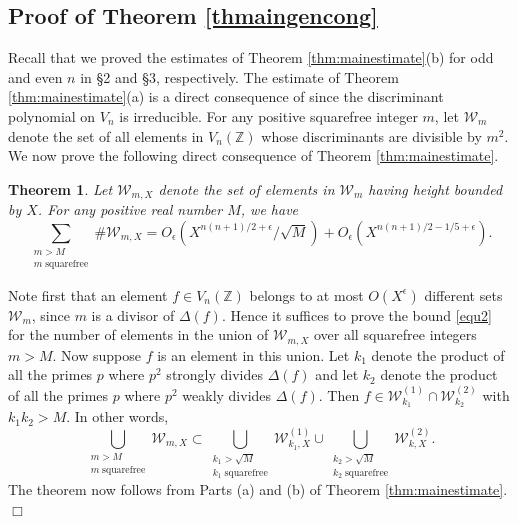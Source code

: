 \documentclass[11pt]{article}
\def\Z{{\mathbb Z}}
\def\U{{\mathcal W}}
\def\Vmn{{V_n}}
\def\Z{{\mathbb Z}}
\newtheorem{theorem}{Theorem}[section]
\newenvironment{proof}{\noindent {\bf Proof:}}{$\Box$ \vspace{2 ex}}
\begin{document}
\subsection{Proof of Theorem \ref{thmaingencong}}

Recall that we proved the estimates of Theorem
\ref{thm:mainestimate}(b) for odd and even $n$ in \S2 and \S3,
respectively. The estimate of Theorem \ref{thm:mainestimate}(a) is a
direct consequence of \cite[Theorem 3.5, Lemma 3.6]{geosieve} since
the discriminant polynomial on $\Vmn$ is irreducible.  For any
positive squarefree integer $m$, let $\U_m$ denote the set of all
elements in $\Vmn(\Z)$ whose discriminants are divisible by $m^2$. We
now prove the following direct consequence of Theorem \ref{thm:mainestimate}.

\begin{theorem}\label{unif}
Let $\U_{m,X}$ denote the set of elements in $\U_m$ having height
bounded by $X$. For any positive real number $M$, we have
\begin{equation}\label{equ2}
\sum_{\substack{m>M\\ m\;\mathrm{ squarefree}}}
\#\U_{m,X}=O_\epsilon(X^{n(n+1)/2+\epsilon}/\sqrt{M})+O_\epsilon(X^{n(n+1)/2-1/5+\epsilon}).
\end{equation}
\end{theorem}
\begin{proof}
Note first that an element $f\in \Vmn(\Z)$ belongs to at most
$O(X^\epsilon)$ different sets $\U_m$, since $m$ is a divisor of
$\Delta(f)$. Hence it suffices to prove the bound \eqref{equ2} for the
number of elements in the union of $\U_{m,X}$ over all squarefree
integers $m>M$. Now suppose $f$ is an element in this union. Let $k_1$
denote the product of all the primes $p$ where $p^2$ strongly divides
$\Delta(f)$ and let $k_2$ denote the product of all the primes $p$
where $p^2$ weakly divides $\Delta(f)$. Then $f\in
\U_{k_1}^{(1)}\cap\U_{k_2}^{(2)}$ with $k_1k_2>M$. In other words,
$$\bigcup_{\substack{m>M\\ m\;\mathrm{ squarefree}}} \U_{m,X} \subset \bigcup_{\substack{k_1>\sqrt{M}\\ k_1\;\mathrm{ squarefree}}} \U_{k_1,X}^{(1)} \cup \bigcup_{\substack{k_2>\sqrt{M}\\ k_2\;\mathrm{ squarefree}}} \U_{k,X}^{(2)}.$$
The theorem now follows from Parts (a) and (b) of Theorem
\ref{thm:mainestimate}.
\end{proof}
\end{document}
